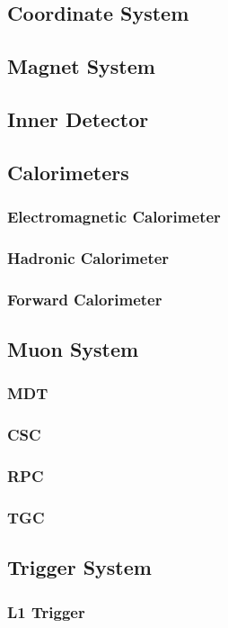 \subsection{Coordinate System}
\subsection{Magnet System}
\subsection{Inner Detector}
\subsection{Calorimeters}
\subsubsection{Electromagnetic Calorimeter}
\subsubsection{Hadronic Calorimeter}
\subsubsection{Forward Calorimeter}
\subsection{Muon System}
\subsubsection{MDT} %
\subsubsection{CSC} %
\subsubsection{RPC}
\subsubsection{TGC}
\subsection{Trigger System}
\subsubsection{L1 Trigger}

